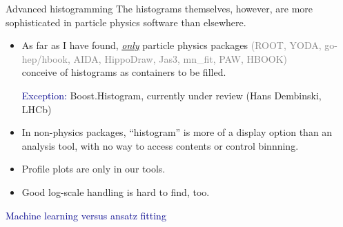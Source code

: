 \documentclass[aspectratio=169]{beamer}
\begin{document}
\begin{frame}{Advanced histogramming}
\Large
\vspace{0.25 cm}
The histograms themselves, however, are more sophisticated in particle physics software than elsewhere.

\large
\begin{itemize}\setlength{\itemsep}{0.25 cm}
\item<2-> As far as I have found, \underline{\it only} particle physics packages \textcolor{gray}{(ROOT, YODA, go-hep/hbook, AIDA, HippoDraw, Jas3, mn\_fit, PAW, HBOOK)} \\ conceive of histograms as containers to be filled.

\vspace{0.25 cm}
{\normalsize \textcolor{darkblue}{Exception:} Boost.Histogram, currently under review (Hans Dembinski, LHCb)}

\item<3-> In non-physics packages, ``histogram'' is more of a display option than an analysis tool, with no way to access contents or control binnning.

\item<4-> Profile plots are only in our tools.

\item<5-> Good log-scale handling is hard to find, too.
\end{itemize}

\begin{center}
\end{center}
\end{frame}

\begin{frame}{}
\huge
\vspace{0.5 cm}
\begin{center}
\textcolor{darkblue}{Machine learning versus ansatz fitting}
\end{center}
\end{frame}
\end{document}
